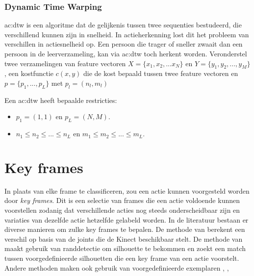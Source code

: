 \subsubsection{Dynamic Time Warping}
\gls{ac:dtw} is een algoritme dat de gelijkenis tussen twee sequenties bestudeerd, die verschillend kunnen zijn in snelheid. In actieherkenning lost dit het probleem van verschillen in actiesnelheid op. Een persoon die trager of sneller zwaait dan een persoon in de leerverzameling, kan via \gls{ac:dtw} toch herkent worden. Veronderstel twee verzamelingen van feature vectoren $X = \{x_1, x_2, ... x_N\}$ en $Y = \{y_1, y_2, ..., y_M\}$, een kostfunctie $c(x, y)$ die de kost bepaald tussen twee feature vectoren en $p = \{p_1, ..., p_L\}$ met $p_l = (n_l, m_l)$  

Een \gls{ac:dtw} heeft bepaalde restricties:
\begin{itemize}
	\item $p_1 = (1, 1)$ en $p_L = (N, M)$.
	\item $n_1 \leq n_2 \leq ... \leq n_L$ en $m_1 \leq m_2 \leq ... \leq m_L$.
\end{itemize}


\section{Key frames}
In plaats van elke frame te classificeren, zou een actie kunnen voorgesteld worden door \textit{key frames}. Dit is een selectie van frames die een actie voldoende kunnen voorstellen zodanig dat verschillende acties nog steeds onderscheidbaar zijn en variaties van dezelfde actie hetzelfde gelabeld worden. In de literatuur bestaan er diverse manieren om zulke key frames te bepalen. De methode van \cite{Suolan2017} berekent een verschil op basis van de joints die de Kinect beschikbaar stelt. De methode van \cite{Carlsson2001} maakt gebruik van randdetectie om silhouette te bekommen en zoekt een match tussen voorgedefinieerde silhouetten die een key frame van een actie voorstelt. Andere methoden maken ook gebruik van voorgedefinieerde exemplaren \cite{Weinland2008a}, \cite{Fathi2007},



